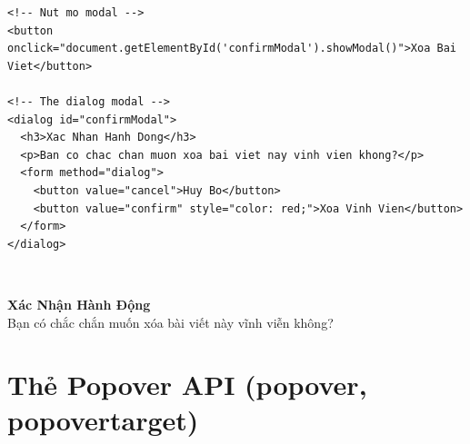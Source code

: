 \begin{codeWindow}
\begin{lstlisting}[language=HTML5]
<!-- Nut mo modal -->
<button onclick="document.getElementById('confirmModal').showModal()">Xoa Bai Viet</button>

<!-- The dialog modal -->
<dialog id="confirmModal">
  <h3>Xac Nhan Hanh Dong</h3>
  <p>Ban co chac chan muon xoa bai viet nay vinh vien khong?</p>
  <form method="dialog">
    <button value="cancel">Huy Bo</button>
    <button value="confirm" style="color: red;">Xoa Vinh Vien</button>
  </form>
</dialog>
\end{lstlisting}
\end{codeWindow}

\begin{browserWindow}
\sffamily\small
{} \\[10pt]

\begin{center}
\begin{tcolorbox}[arc=4pt, colback=white, colframe=primaryBlue, boxsep=8pt, width=0.85\linewidth, halign=center]
  \textbf{\textcolor{primaryBlue}{Xác Nhận Hành Động}} \\[4pt]
  {\small Bạn có chắc chắn muốn xóa bài viết này vĩnh viễn không?} \\[8pt]
   \qquad
\end{tcolorbox}
\end{center}
\end{browserWindow}

\section{Thẻ Popover API (popover, popovertarget)}
\label{sec:popover_api}

